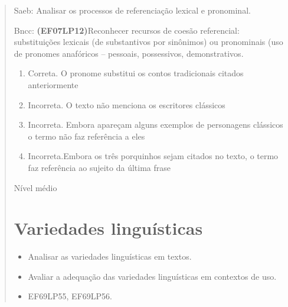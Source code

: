 {\begin{quote}
{Saeb: Analisar os processos de referenciação lexical e pronominal.

Bncc: \textbf{(EF07LP12)}Reconhecer recursos de coesão referencial:
substituições lexicais (de substantivos por sinônimos) ou pronominais
(uso de pronomes anafóricos -- pessoais, possessivos, demonstrativos.

\begin{enumerate}
\def\labelenumi{\arabic{enumi}.}
\item
  Correta. O pronome substitui os contos tradicionais citados
  anteriormente
\item
  Incorreta. O texto não menciona os escritores clássicos
\item
  Incorreta. Embora apareçam alguns exemplos de personagens clássicos o
  termo não faz referência a eles
\item
  Incorreta.Embora os três porquinhos sejam citados no texto, o termo
  faz referência ao sujeito da última frase
\end{enumerate}

Nível médio


\chapter{Variedades linguísticas}


\begin{itemize}

  \item Analisar as variedades linguísticas em textos.

  \item Avaliar a adequação das variedades linguísticas em contextos de uso.

\end{itemize}


\begin{itemize}

  \item EF69LP55, EF69LP56.

\begin{itemize}

\end{itemize}
\end{itemize}}
\end{quote}}
